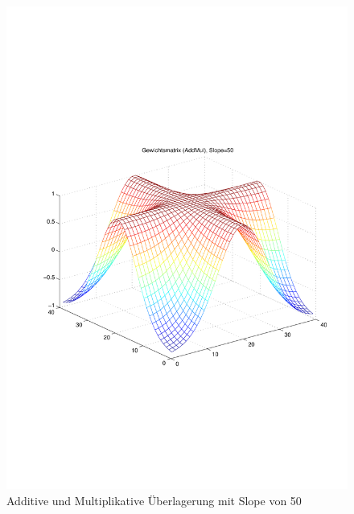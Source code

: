 \begin{figure}[hbt]
\begin{minipage}{0.5 \textwidth}
		\includegraphics[width=\textwidth]{./Bilder/Auswertung/Gewichtsmatrix/Gewichtsmatrix_AddMul_Slope_50}
		\caption{Additive und Multiplikative Überlagerung mit Slope von 50}
		\label{AddMul50}
	\end{minipage}
\end{figure}

